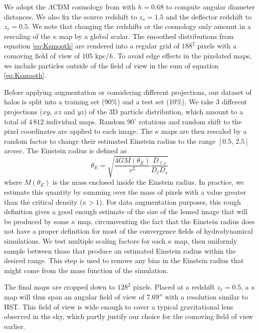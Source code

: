 \documentclass[twocolumn]{aastex631}
\begin{document}
We adopt the $\Lambda$CDM cosmology from 
\citet{PlanckCollaboration2018} with $h=0.68$ to compute 
angular diameter distances. We also fix the 
source redshift to $z_s=1.5$ and the deflector redshift to $z_\ell=0.5$. 
We note that changing the redshifts or the cosmology 
only amount in a rescaling of the $\kappa$ map by a global scalar.
The smoothed distributions from equation \eqref{eq:Ksmooth} are 
rendered into a regular grid of $188^2$ pixels with a comoving field of view of $105\,\,\mathrm{kpc}/h$. 
To avoid 
edge effects in the pixelated maps, we include particles outside of the field of view in the sum of equation \eqref{eq:Ksmooth}.
\par
Before applying augmentation or considering different projections, our dataset of halos is split into a 
training set (90\%) and a test set (10\%).
We take 3 different projections ($xy$, $xz$ and $yz$) of the 3D particle 
distribution, which amount to a total of $4\,812$ individual maps. 
Random $90^{\circ}$ rotations and random shift to the pixel coordinates are applied to each 
image. The $\kappa$ maps are then rescaled by a random factor to change their 
estimated Einstein radius to the range 
$[0.5,\,2.5]$ arcsec.
The Einstein radius is defined as
\begin{equation}\label{eq:ThetaE}
        \theta_E = \sqrt{\frac{4GM(\theta_E)}{c^ 2} \frac{D_{\ell s}}{D_\ell D_s}}
\end{equation} 
where $M(\theta_E)$ is the mass enclosed inside the Einstein radius. In practice, we estimate this quantity 
by summing over the mass of pixels with a value greater than the critical density ($\kappa > 1$). 
For data augmentation purposes, this rough definition gives a good enough estimate of the 
size of the lensed image that will be produced by some $\kappa$ map, 
circumventing the fact that the Einstein radius does not have a proper definition for most of the convergence fields of 
hydrodynamical simulations.
We test multiple scaling factors for each $\kappa$ map, then uniformly sample between those that produce an estimated 
Einstein radius within the 
desired range. This step is used to remove any bias in the Einstein radius that might come from the mass function 
of the simulation. 

The final maps are cropped down to $128^2$ pixels.
Placed at a redshift $z_\ell=0.5$, a $\kappa$ map will thus span an angular field of view of $7.69''$ with 
a resolution similar to HST. This field of view is wide enough to cover a typical gravitational 
lens observed in the sky, which partly justify our choice for the comoving field of view earlier. 
\end{document}
